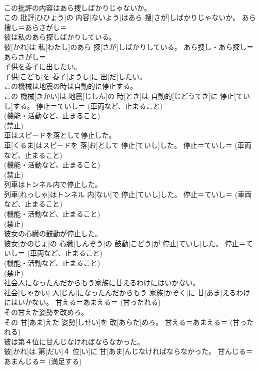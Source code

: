 \documentclass[8pt]{extreport}
\begin{document}
\begin{CJK}{UTF8}{min}
{\\	この批評の内容はあら捜しばかりじゃないか。	
\\	この 批評[ひひょう]の 内容[ないよう]はあら 捜[さが]しばかりじゃないか。	あら捜し＝あらさがし＝ 
\\	彼は私のあら探しばかりしている。	
\\	彼[かれ]は 私[わたし]のあら 探[さが]しばかりしている。	あら捜し・あら探し＝あらさがし＝ 
\\	子供を養子に出したい。	
\\	子供[こども]を 養子[ようし]に 出[だ]したい。	
\\	この機械は地震の時は自動的に停止する。	
\\	この 機械[きかい]は 地震[じしん]の 時[とき]は 自動的[じどうてき]に 停止[ていし]する。	停止＝ていし＝ (車両など、止まること) 
\\	(機能・活動など、止まること) 
\\	(禁止) 
\\	車はスピードを落として停止した。	
\\	車[くるま]はスピードを 落[お]として 停止[ていし]した。	停止＝ていし＝ (車両など、止まること) 
\\	(機能・活動など、止まること) 
\\	(禁止) 
\\	列車はトンネル内で停止した。	
\\	列車[れっしゃ]はトンネル 内[ない]で 停止[ていし]した。	停止＝ていし＝ (車両など、止まること) 
\\	(機能・活動など、止まること) 
\\	(禁止) 
\\	彼女の心臓の鼓動が停止した。	
\\	彼女[かのじょ]の 心臓[しんぞう]の 鼓動[こどう]が 停止[ていし]した。	停止＝ていし＝ (車両など、止まること) 
\\	(機能・活動など、止まること) 
\\	(禁止) 
\\	社会人になったんだからもう家族に甘えるわけにはいかない。	
\\	社会[しゃかい] 人[じん]になったんだからもう 家族[かぞく]に 甘[あま]えるわけにはいかない。	甘える＝あまえる＝ (甘ったれる) 
\\	その甘えた姿勢を改めろ。	
\\	その 甘[あま]えた 姿勢[しせい]を 改[あらた]めろ。	甘える＝あまえる＝ (甘ったれる) 
\\	彼は第４位に甘んじなければならなかった。	
\\	彼[かれ]は 第[だい]４ 位[い]に 甘[あま]んじなければならなかった。	甘んじる＝あまんじる＝ (満足する) 
}
\end{CJK}
\end{document}

